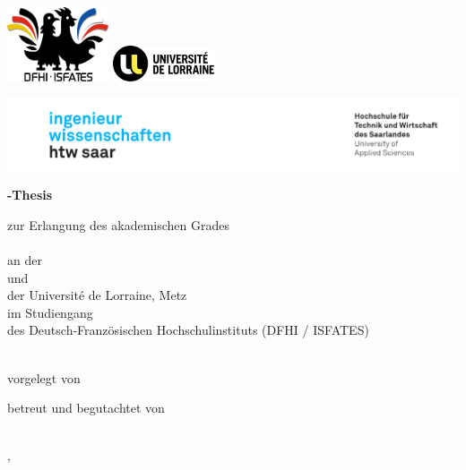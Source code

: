 \begin{titlepage}\linespread{1.5}\selectfont
\noindent\includegraphics[width=3cm]{Graphics/logo-dfhi} \hfill \includegraphics[width=3cm]{Graphics/logo-uni-de-lorraine} \medskip

\noindent\includegraphics[width=\linewidth]{Graphics/htwsaar_Logo_inwi_head_VF_4C_crop}

  \begin{center}
    \large  
    \hfill
    \vfill
    \begingroup
      \Large\bfseries\myDegreeType-Thesis 
    \endgroup
		
	\bigskip
		
    zur Erlangung des akademischen Grades \\
    \myDegree \\ 
    an der \myUni \\
	und \\
	der Université de Lorraine, Metz \\ 
    im Studiengang \myDegreeCourse \\
    des Deutsch-Französischen Hochschulinstituts (DFHI / ISFATES) \\ 
    
  \vfill
	
  \begingroup
    \Large\bfseries\myTitle 
  \endgroup
	
	\bigskip
	
  vorgelegt von \\
  \myName
	
  \vfill
	
  betreut und begutachtet von \\
  \myFirstProf \\
  \mySecondProf 
	
  \vfill
	
  \myLocation, \myTime                   

    \end{center}       
\end{titlepage}   